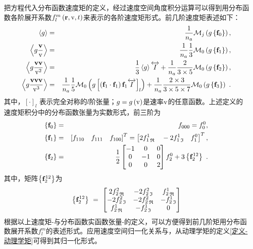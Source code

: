   把方程代入分布函数速度矩的定义，经过速度空间角度积分运算可以得到用分布函数各阶展开系数$f_l^m \left(\mathbf{r},\mathrm{v},t \right)$来表示的各阶速度矩形式。前几阶速度矩表述如下：
  \begin{eqnarray}
      \left < g \right> &=& \frac{1}{n_a} \mathcal{M}_j \left(g \left \{\mathbf{f}_0 \right\} \right), \label{Mg0} \\
      \left < g \frac{\mathbf{v}}{\mathrm{v}} \right> &=& \frac{1}{n_a} \frac{1}{3} \mathcal{M}_0 \left(g \left \{\mathbf{f}_1 \right\} \right), \label{Mg1} \\
      \left < g \frac{\mathbf{v} \mathbf{v}}{\mathrm{v}^2} \right> &=&  \frac{1}{3} \left < g \right> \overleftrightarrow{I} + \frac{1}{n_a} \frac{2}{3 \times 5} \mathcal{M}_0 \left(g \left \{\mathbf{f}_2 \right\} \right), \label{Mg2} \\
      \left < g \frac{\mathbf{v} \mathbf{v} \mathbf{v}}{\mathrm{v}^3} \right> &=&  \frac{1}{n_a} \frac{1}{5} \mathcal{M}_0 \left(g \left [\left(\mathbf{f}_1 \cdot \mathbf{f}_1 \right) \mathbf{f}_1 \overleftrightarrow{I} \right]_l \right) + \frac{1}{n_a} \frac{2 \times 3}{3 \times 5 \times 7} \mathcal{M}_0 \left(g \left \{\mathbf{f}_3 \right\} \right) ~. \label{Mg3}
  \end{eqnarray}
  其中，$\left [\cdot \right]_l$ 表示完全对称的$l$阶张量；$g=g\left(\mathrm{v} \right)$是速率$\mathrm{v}$的任意函数。上述定义的速度矩积分中的分布函数张量为实数形式，前三阶为
  \begin{eqnarray}
      \left \{\mathbf{f}_0 \right \} &=& f_{000} = f_0^0, \label{fhj0I}\\
      \left \{\mathbf{f}_1 \right \} &=& \left [f_{110} \quad f_{111} \quad f_{100} \right]^T =  \left [2 {f_1^1}_{\mathfrak{R}} \quad -2 {f_1^1}_{\mathfrak{I}} \quad f_1^0 \right]^T,  \label{fhj1I}\\ 
      \left \{\mathbf{f}_2 \right \} &=& \frac{1}{2} 
      \begin{bmatrix}
      -1 & 0 & 0 \\
      0 & -1 & 0 \\
      0 & 0 & 2 \\
      \end{bmatrix}
      f_2^0 + 3 \left \{\mathbf{f}_2^{12} \right \} ~. \label{fhj2I}
  \end{eqnarray}
  其中，矩阵$\left \{\mathbf{f}_2^{12} \right \}$为
  \begin{equation}
      \left \{\mathbf{f}_2^{12} \right \} \ = \  
      \begin{bmatrix}
      2 {f_2^2}_{\mathfrak{R}} & -2 {f_2^2}_{\mathfrak{I}} & {f_2^1}_{\mathfrak{R}} \\
      -2 {f_2^2}_{\mathfrak{I}} & -2 {f_2^2}_{\mathfrak{R}} & -{f_2^1}_{\mathfrak{I}} \\
      {f_2^1}_{\mathfrak{R}} & -{f_2^1}_{\mathfrak{I}} & 0 \\
      \end{bmatrix} \label{f212}
  \end{equation}
  根据以上速度矩-与分布函数实函数张量-的定义，可以方便得到前几阶矩用分布函数展开系数$f_l^m$的表述形式。应用速度空间归一化关系与，从动理学矩的定义\ref{定义-动理学矩}可得到其归一化形式。
  
